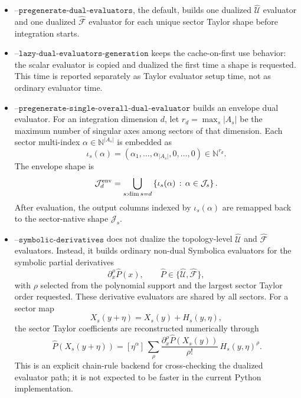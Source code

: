 \documentclass[11pt]{article}
\newcommand{\hU}{\widehat{\mathcal U}}
\newcommand{\hF}{\widehat{\mathcal F}}
\newcommand{\hP}{\widehat P}
\begin{document}
\begin{itemize}
  \item \(\texttt{--pregenerate-dual-evaluators}\), the default, builds one
  dualized \(\hU\) evaluator and one dualized \(\hF\) evaluator for each
  unique sector Taylor shape before integration starts.
  \item \(\texttt{--lazy-dual-evaluators-generation}\) keeps the cache-on-first
  use behavior: the scalar evaluator is copied and dualized the first time a
  shape is requested.  This time is reported separately as Taylor evaluator
  setup time, not as ordinary evaluator time.
  \item \(\texttt{--pregenerate-single-overall-dual-evaluator}\) builds an
  envelope dual evaluator.  For an integration dimension \(d\), let
  \(r_d=\max_s |A_s|\) be the maximum number of singular axes among sectors
  of that dimension.  Each sector multi-index
  \(\alpha\in\mathbb N^{|A_s|}\) is embedded as
  \begin{equation}
    \iota_s(\alpha)
    =
    (\alpha_1,\ldots,\alpha_{|A_s|},0,\ldots,0)
    \in\mathbb N^{r_d}.
  \end{equation}
  The envelope shape is
  \begin{equation}
    \mathcal J_d^{\rm env}
    =
    \bigcup_{s:\dim s=d}
    \left\{\iota_s(\alpha)\,:\,\alpha\in\mathcal J_s\right\}.
  \end{equation}
  After evaluation, the output columns indexed by
  \(\iota_s(\alpha)\) are remapped back to the sector-native shape
  \(\mathcal J_s\).
  \item \(\texttt{--symbolic-derivatives}\) does not dualize the topology-level
  \(\hU\) and \(\hF\) evaluators.  Instead, it builds ordinary non-dual
  Symbolica evaluators for the symbolic partial derivatives
  \begin{equation}
    \partial_x^\rho \hP(x),
    \qquad
    \hP\in\{\hU,\hF\},
  \end{equation}
  with \(\rho\) selected from the polynomial support and the largest sector
  Taylor order requested.  These derivative evaluators are shared by all
  sectors.  For a sector map
  \begin{equation}
    X_s(y+\eta)=X_s(y)+H_s(y,\eta),
  \end{equation}
  the sector Taylor coefficients are reconstructed numerically through
  \begin{equation}
    [\eta^\alpha]\,\hP(X_s(y+\eta))
    =
    [\eta^\alpha]\,
    \sum_{\rho}
    \frac{\partial_x^\rho\hP(X_s(y))}{\rho!}\,
    H_s(y,\eta)^\rho .
  \end{equation}
  This is an explicit chain-rule backend for cross-checking the dualized
  evaluator path; it is not expected to be faster in the current Python
  implementation.
\end{itemize}
\end{document}
